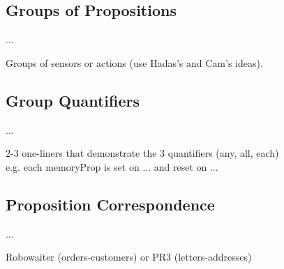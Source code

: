 \subsection{Groups of Propositions} 

...

\begin{myExample}\label{Ex:groups}
	Groups of sensors or actions (use Hadas's and Cam's ideas).
\end{myExample}

\subsection{Group Quantifiers} 

...

\begin{myExample}\label{Ex:quantifiers}
	2-3 one-liners that demonstrate the 3 quantifiers (any, all, each)\\
	e.g. each memoryProp is set on ... and reset on ...
\end{myExample}

\subsection{Proposition Correspondence} 

...

\begin{myExample}\label{Ex:corresponding}
	Robowaiter (orders-customers) or PR3 (letters-addresses)
\end{myExample}

%
%

